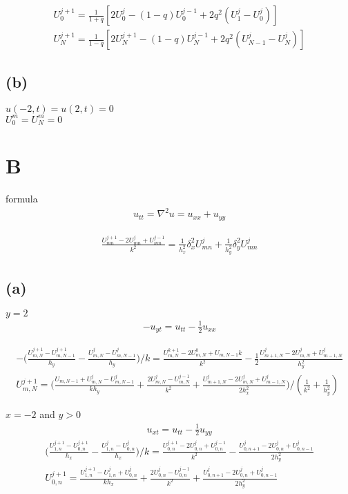 \documentclass[en,hazy,screen,blue,normal]{elegantnote}
\begin{document}
\begin{align*}
    U_0^{j+1} = \frac{1}{1+q} [2U_0^j -(1-q)U_0^{j-1} + 2q^2(U_1^j - U_0^j)] \\
    U_N^{j+1} = \frac{1}{1-q} [2U_N^{j+1} -(1-q)U_{N}^{j-1} + 2q^2 (U_{N-1}^j - U_{N}^j)]
\end{align*}



\subsection{(b)}
$u(-2, t) = u(2, t) = 0$ \\
$U_0^m = U_N^m = 0$



\section{B}
formula
\begin{align*}
    u_{tt} = \nabla^2 u = u_{xx} + u_{yy}
\end{align*}

\begin{align*}
    \frac{U_{mn}^{j+1}-2U_{mn}^{j}+U_{mn}^{j-1}}{k^2}
    = \frac{1}{h_x^2} \delta_{x}^2 U_{mn}^{j} + \frac{1}{h_y^2} \delta_{y}^2 U_{mn}^{j}
\end{align*}

\subsection{(a)}
$y=2$
\begin{align*}
    -u_{yt} = u_{tt} - \frac{1}{2} u_{xx}
\end{align*}

\begin{align*}
    - \biggl(\frac{U_{m, N}^{j+1} - U_{m, N-1}^{j+1}}{h_y} - \frac{U_{m, N}^j - U_{m, N-1}^j}{h_y}\biggr)/k = \frac{U_{m,N}^{k+1} - 2U_{m,N}^{k} + U_{m,N-1}{k}}{k^2} - \frac{1}{2} \frac{U_{m+1, N}^{j} - 2U_{m,N}^j + U_{m-1, N}^j}{h_y^2} \\
    U_{m, N}^{j+1} = \biggl(\frac{U_{m, N-1} + U_{m,N}^j - U_{m, N-1}^j}{k h_y} + \frac{2U_{m,N}^j - U_{m, N}^{j-1}}{k^2} + \frac{U_{m+1, N}^j - 2U_{m, N}^j + U_{m-1, N}^j}{2h_x^2} \biggr)/(\frac{1}{k^2} + \frac{1}{h_y^2})
\end{align*}

$x=-2$ and $y>0$
\begin{align*}
    u_{xt} = u_{tt} - \frac{1}{2} u_{yy}
\end{align*}
\begin{align*}
    \biggl(\frac{U_{1, n}^{j+1} - U_{0, n}^{j+1}}{h_x} - \frac{U_{1, n}^{j} - U_{0, n}^{j}}{h_x}\biggr)/k
    = \frac{U_{0, n}^{j+1} - 2U_{0, n}^j + U_{0, n}^{j-1}}{k^2} - \frac{U_{0, n+1}^j - 2U_{0, n}^j + U_{0, n-1}^j}{2 h_y^2} \\
    U_{0, n}^{j+1} = \frac{U_{1, n}^{j+1} - U_{1, n}^{j} + U_{0, n}^j}{k h_x} + \frac{2 U_{0, n}^{j} - U_{0, n}^{j-1}}{k^2} + \frac{U_{0, n+1}^{j} - 2U_{0, n}^j + U_{0, n-1}^j}{2h_y^2}
\end{align*}
\end{document}
